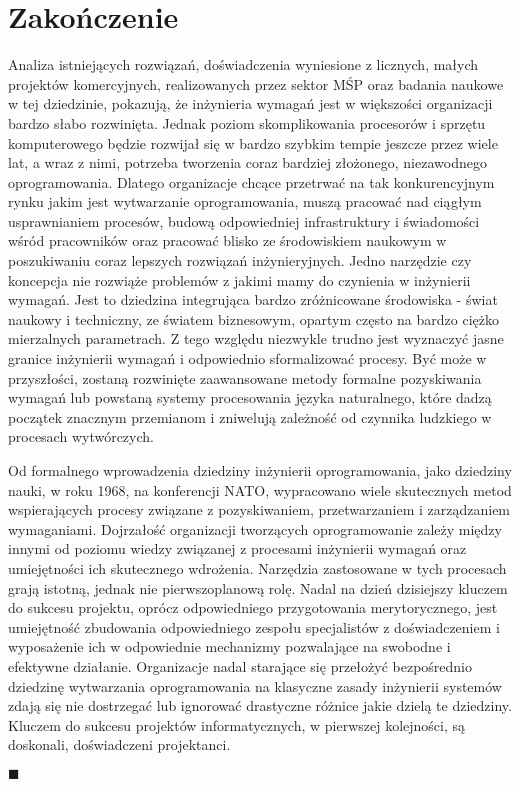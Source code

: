     
  \section{Zakończenie}

    Analiza istniejących rozwiązań, doświadczenia wyniesione z licznych, małych projektów komercyjnych, realizowanych przez sektor MŚP oraz badania naukowe w tej dziedzinie, pokazują, że inżynieria wymagań jest w większości organizacji bardzo słabo rozwinięta. Jednak poziom skomplikowania procesorów i sprzętu komputerowego będzie rozwijał się w bardzo szybkim tempie jeszcze przez wiele lat, a wraz z nimi, potrzeba tworzenia coraz bardziej złożonego, niezawodnego oprogramowania. Dlatego organizacje chcące przetrwać na tak konkurencyjnym rynku jakim jest wytwarzanie oprogramowania, muszą pracować nad ciągłym usprawnianiem procesów, budową odpowiedniej infrastruktury i świadomości wśród pracowników oraz pracować blisko ze środowiskiem naukowym w poszukiwaniu coraz lepszych rozwiązań inżynieryjnych. Jedno narzędzie czy koncepcja nie rozwiąże problemów z jakimi mamy do czynienia w inżynierii wymagań. Jest to dziedzina integrująca bardzo zróżnicowane środowiska - świat naukowy i techniczny, ze światem biznesowym, opartym często na bardzo ciężko mierzalnych parametrach. Z tego względu niezwykle trudno jest wyznaczyć jasne granice inżynierii wymagań i odpowiednio sformalizować procesy. Być może w przyszłości, zostaną rozwinięte zaawansowane metody formalne pozyskiwania wymagań lub powstaną systemy procesowania języka naturalnego, które dadzą początek znacznym przemianom i zniwelują zależność od czynnika ludzkiego w procesach wytwórczych. 

    Od formalnego wprowadzenia dziedziny inżynierii oprogramowania, jako dziedziny nauki, w roku 1968, na konferencji NATO, wypracowano wiele skutecznych metod wspierających procesy związane z pozyskiwaniem, przetwarzaniem i zarządzaniem wymaganiami. Dojrzałość organizacji tworzących oprogramowanie zależy między innymi od poziomu wiedzy związanej z procesami inżynierii wymagań oraz umiejętności ich skutecznego wdrożenia. Narzędzia zastosowane w tych procesach grają istotną, jednak nie pierwszoplanową rolę. Nadal na dzień dzisiejszy kluczem do sukcesu projektu, oprócz odpowiedniego przygotowania merytorycznego, jest umiejętność zbudowania odpowiedniego zespołu specjalistów z doświadczeniem i wyposażenie ich w odpowiednie mechanizmy pozwalające na swobodne i efektywne działanie. Organizacje nadal starające się przełożyć bezpośrednio dziedzinę wytwarzania oprogramowania na klasyczne zasady inżynierii systemów zdają się nie dostrzegać lub ignorować drastyczne różnice jakie dzielą te dziedziny. Kluczem do sukcesu projektów informatycznych, w pierwszej kolejności, są doskonali, doświadczeni projektanci.

$ \blacksquare $
